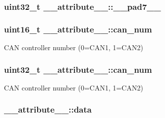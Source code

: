 \subsubsection[{\texorpdfstring{\+\_\+\+\_\+pad7\+\_\+\+\_\+}{__pad7__}}]{\setlength{\rightskip}{0pt plus 5cm}uint32\+\_\+t \+\_\+\+\_\+attribute\+\_\+\+\_\+\+::\+\_\+\+\_\+pad7\+\_\+\+\_\+}\hypertarget{struct____attribute_____a41bb8f240ea90dcb866b722bac4b7496}{}\label{struct____attribute_____a41bb8f240ea90dcb866b722bac4b7496}
\subsubsection[{\texorpdfstring{can\+\_\+num}{can_num}}]{\setlength{\rightskip}{0pt plus 5cm}uint16\+\_\+t \+\_\+\+\_\+attribute\+\_\+\+\_\+\+::can\+\_\+num}\hypertarget{struct____attribute_____a3030b7aabe9418f3a7dcd682fe34fadc}{}\label{struct____attribute_____a3030b7aabe9418f3a7dcd682fe34fadc}


C\+AN controller number (0=C\+A\+N1, 1=C\+A\+N2) 

\subsubsection[{\texorpdfstring{can\+\_\+num}{can_num}}]{\setlength{\rightskip}{0pt plus 5cm}uint32\+\_\+t \+\_\+\+\_\+attribute\+\_\+\+\_\+\+::can\+\_\+num}\hypertarget{struct____attribute_____a7d526d3c59c97be7b5ef1924151f7de8}{}\label{struct____attribute_____a7d526d3c59c97be7b5ef1924151f7de8}


C\+AN controller number (0=C\+A\+N1, 1=C\+A\+N2) 

\subsubsection[{\texorpdfstring{data}{data}}]{ \+\_\+\+\_\+attribute\+\_\+\+\_\+\+::data}\hypertarget{struct____attribute_____a671d4cb674b1287a89ab3dd93d8d36e2}{}\label{struct____attribute_____a671d4cb674b1287a89ab3dd93d8d36e2}


